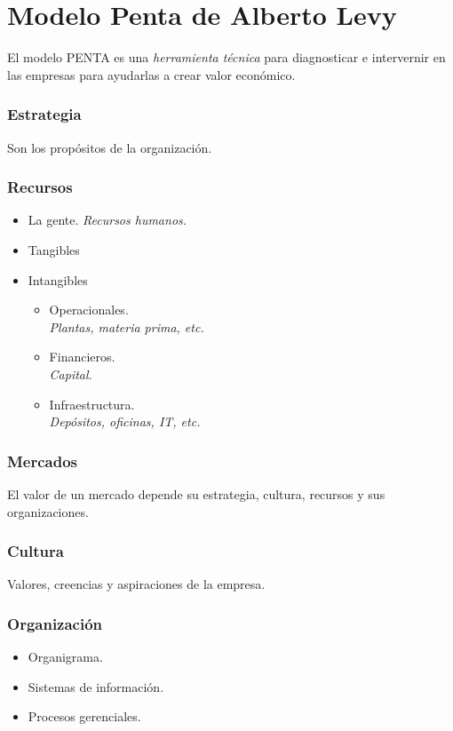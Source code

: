 \documentclass[12pt, spanish, a5paper]{article}
\begin{document}
\part{Modelo Penta de Alberto Levy}

El modelo PENTA es una \emph{herramienta técnica} para diagnosticar e intervernir en las empresas para ayudarlas a crear valor económico.

\section{Estrategia}
Son los propósitos de la organización.

\section{Recursos}

\begin{itemize}
	\item La gente. \textit{Recursos humanos.}
	\item Tangibles
	\item Intangibles
		\begin{itemize}
			\item Operacionales.\\
			\textit{Plantas, materia prima, etc.}
			\item Financieros.\\
			\textit{Capital}.
			\item Infraestructura. \\
			\textit{Depósitos, oficinas, IT, etc.}
		\end{itemize}
\end{itemize}

\section{Mercados}

El valor de un mercado depende su estrategia, cultura, recursos y sus organizaciones.

\section{Cultura}
Valores, creencias y aspiraciones de la empresa.

\section{Organización}
\begin{itemize}
	\item Organigrama.
	\item Sistemas de información.
	\item Procesos gerenciales.
\end{itemize}
\end{document}
